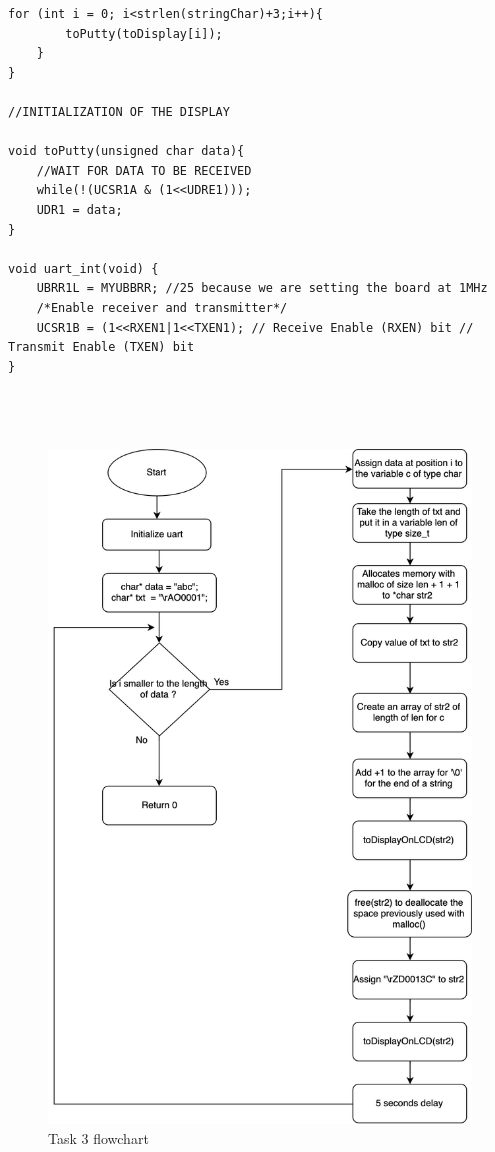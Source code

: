 \documentclass[a4paper,12pt]{article}
\begin{document}
\begin{lstlisting}[style=CStyle]
	for (int i = 0; i<strlen(stringChar)+3;i++){
		toPutty(toDisplay[i]);
	}
}

//INITIALIZATION OF THE DISPLAY 

void toPutty(unsigned char data){
	//WAIT FOR DATA TO BE RECEIVED
	while(!(UCSR1A & (1<<UDRE1)));
	UDR1 = data;
}

void uart_int(void) { 
	UBRR1L = MYUBBRR; //25 because we are setting the board at 1MHz
	/*Enable receiver and transmitter*/
	UCSR1B = (1<<RXEN1|1<<TXEN1); // Receive Enable (RXEN) bit // Transmit Enable (TXEN) bit
}




\end{lstlisting}
\break
\begin{figure}
\begin{center}
\includegraphics[width=\textwidth/2]{flowchart/task3_flowchart.png}
\end{center}
\caption{Task 3 flowchart}
\label{task3}
\end{figure}
\end{document}
